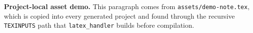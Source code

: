 \noindent\textbf{Project-local asset demo.} This paragraph comes from
\texttt{assets/demo-note.tex}, which is copied into every generated project and
found through the recursive \texttt{TEXINPUTS} path that \texttt{latex\_handler}
builds before compilation.
